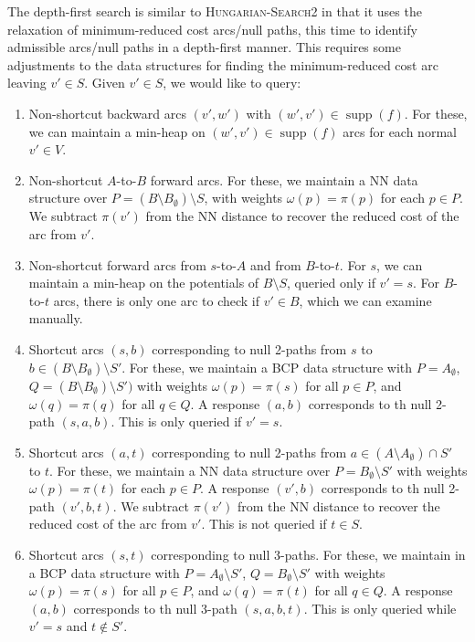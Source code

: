\documentclass[11pt]{article}
\def\supp{\operatorname{supp}}
\theoremstyle{plain}
\numberwithin{figure}{section}
\begin{document}
The depth-first search is similar to \textsc{Hungarian-Search2} in that it
uses the relaxation of minimum-reduced cost arcs/null paths, this time to
identify admissible arcs/null paths in a depth-first manner.
This requires some adjustments to the data structures for finding the
minimum-reduced cost arc leaving $v' \in S$.
Given $v' \in S$, we would like to query:
\begin{enumerate}
\item Non-shortcut backward arcs $(v', w')$ with $(w', v') \in \supp(f)$.
	For these, we can maintain a min-heap on $(w', v') \in \supp(f)$ arcs
	for each normal $v' \in V$.
\item Non-shortcut $A$-to-$B$ forward arcs.
	For these, we maintain a NN data structure over
	$P = (B \setminus B_\emptyset) \setminus S$, with weights
	$\omega(p) = \pi(p)$ for each $p \in P$.
	We subtract $\pi(v')$ from the NN distance to recover the reduced cost
	of the arc from $v'$.
\item Non-shortcut forward arcs from $s$-to-$A$ and from $B$-to-$t$.
	For $s$, we can maintain a min-heap on the potentials of
	$B \setminus S$, queried only if $v' = s$.
	For $B$-to-$t$ arcs, there is only one arc to check if $v' \in B$,
	which we can examine manually.

\item Shortcut arcs $(s, b)$ corresponding to null 2-paths from $s$ to
	$b \in (B \setminus B_\emptyset) \setminus S'$.
	For these, we maintain a BCP data structure with $P = A_\emptyset$,
	$Q = (B \setminus B_\emptyset) \setminus S')$ with weights
	$\omega(p) = \pi(s)$ for all $p \in P$, and $\omega(q) = \pi(q)$ for
	all $q \in Q$.
	A response $(a, b)$ corresponds to th null 2-path $(s, a, b)$.
	This is only queried if $v' = s$.
\item Shortcut arcs $(a, t)$ corresponding to null 2-paths from
	$a \in (A \setminus A_\emptyset) \cap S'$ to $t$.
	For these, we maintain a NN data structure over
	$P = B_\emptyset \setminus S'$ with weights $\omega(p) = \pi(t)$ for
	each $p \in P$.
	A response $(v', b)$ corresponds to th null 2-path $(v', b, t)$.
	We subtract $\pi(v')$ from the NN distance to recover the reduced cost
	of the arc from $v'$.
	This is not queried if $t \in S$.
\item Shortcut arcs $(s, t)$ corresponding to null 3-paths.
	For these, we maintain in a BCP data structure with
	$P = A_\emptyset \setminus S'$, $Q = B_\emptyset \setminus S'$ with
	weights $\omega(p) = \pi(s)$ for all
	$p \in P$, and $\omega(q) = \pi(t)$ for all $q \in Q$.
	A response $(a, b)$ corresponds to th null 3-path $(s, a, b, t)$.
	This is only queried while $v' = s$ and $t \not\in S'$.
\end{enumerate}
\end{document}
